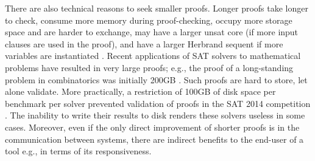 

There are also technical reasons to seek smaller proofs.
Longer proofs take longer to check, consume more memory during proof-checking, occupy more storage space and are harder to exchange, may have a larger unsat core (if more input clauses are used in the proof), and have a larger Herbrand sequent if more variables are instantiated \cite{B10,B16,ResolutionHerbrand,Reis}. Recent applications of SAT solvers to mathematical problems have resulted in very large proofs; e.g., the proof of a long-standing problem in combinatorics was initially 200GB \cite{heule2016solving}. Such proofs are hard to store, let alone validate. More practically, a restriction of 100GB of disk space per benchmark per solver prevented validation of proofs in the SAT 2014 competition \cite{clausal}. 
The inability to write their results to disk renders these solvers useless in some cases. Moreover, even if the only direct improvement of shorter proofs is in the communication between systems, there are indirect benefits to the end-user of a tool e.g., in terms of its responsiveness. 



